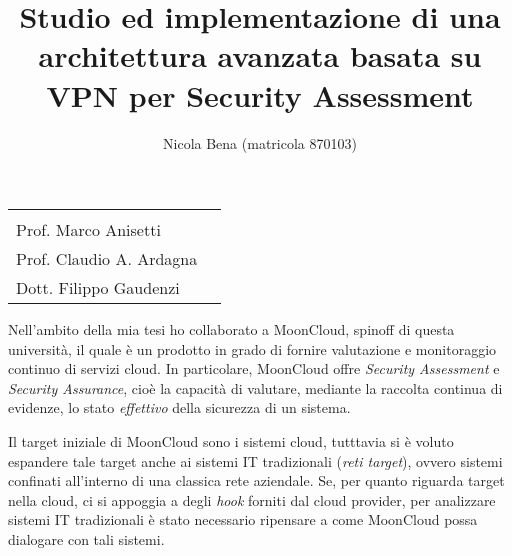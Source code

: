 \documentclass[10pt,a4paper]{article}
\begin{document}
        \title{\textbf{Studio ed implementazione di una architettura avanzata
        basata su VPN per Security Assessment}}
        \author{Nicola Bena (matricola 870103)}
        \date{}

        \maketitle

        \begin{minipage}{.99\linewidth}
            \begin{tabular}{l r}
                \begin{minipage}{.4\linewidth}
                    \begin{flushleft}
                        {\large
                            RELATORE\\[.15cm]
                            Prof. Marco Anisetti
                        }
                    \end{flushleft}
                \end{minipage}
                &
                \begin{minipage}{.6\linewidth}
                    \begin{flushright}
                        {\large
                            CORRELATORI\\[.15cm]
                            Prof. Claudio A. Ardagna\\
                            Dott. Filippo Gaudenzi
                        }
                    \end{flushright}
                \end{minipage}
            \end{tabular}
        \end{minipage}

        Nell'ambito della mia tesi ho collaborato a MoonCloud, spinoff di questa università,
        il quale è un prodotto in grado di fornire valutazione e monitoraggio continuo
        di servizi cloud. In particolare, MoonCloud offre \textit{Security Assessment} e
        \textit{Security Assurance}, cioè la capacità di valutare, mediante
        la raccolta continua di evidenze, lo stato \textit{effettivo} della sicurezza
        di un sistema.

        Il target iniziale di MoonCloud sono i sistemi cloud, tutttavia si è voluto espandere
        tale target anche ai sistemi IT tradizionali (\textit{reti target}), ovvero sistemi
        confinati all'interno di una classica rete aziendale. Se, per quanto riguarda target nella
        cloud, ci si appoggia a degli \textit{hook} forniti dal cloud provider, per analizzare
        sistemi IT tradizionali è stato necessario ripensare a come MoonCloud possa dialogare
        con tali sistemi.
\end{document}
